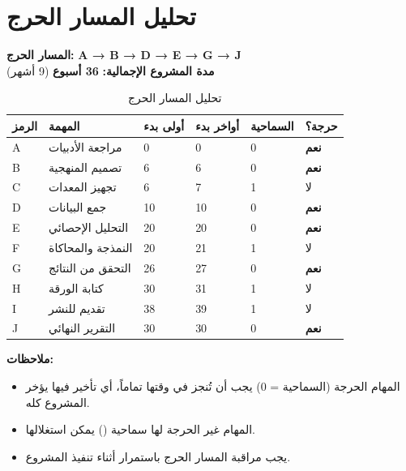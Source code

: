 \documentclass[11pt,a4paper,landscape]{article}
\begin{document}
\section{تحليل المسار الحرج}
\label{sec:analysis}

\textbf{المسار الحرج:} \color{criticalColor}\textbf{A → B → D → E → G → J}\color{black}\\[0.5em]
\textbf{مدة المشروع الإجمالية:} \textbf{36 أسبوع} (9 أشهر)

\begin{table}[H]
\centering
\caption{تحليل المسار الحرج}
\renewcommand{\arraystretch}{1.3}
\begin{tabularx}{\textwidth}{C{1cm} L{4cm} C{2cm} C{2cm} C{2cm} X}
\toprule
\textbf{الرمز} & \textbf{المهمة} & \textbf{أولى بدء} & \textbf{أواخر بدء} & \textbf{السماحية} & \textbf{حرجة؟} \\
\midrule
A & مراجعة الأدبيات & 0 & 0 & 0 & \color{criticalColor}\textbf{نعم} \\
B & تصميم المنهجية & 6 & 6 & 0 & \color{criticalColor}\textbf{نعم} \\
C & تجهيز المعدات & 6 & 7 & 1 & لا \\
D & جمع البيانات & 10 & 10 & 0 & \color{criticalColor}\textbf{نعم} \\
E & التحليل الإحصائي & 20 & 20 & 0 & \color{criticalColor}\textbf{نعم} \\
F & النمذجة والمحاكاة & 20 & 21 & 1 & لا \\
G & التحقق من النتائج & 26 & 27 & 0 & \color{criticalColor}\textbf{نعم} \\
H & كتابة الورقة & 30 & 31 & 1 & لا \\
I & تقديم للنشر & 38 & 39 & 1 & لا \\
J & التقرير النهائي & 30 & 30 & 0 & \color{criticalColor}\textbf{نعم} \\
\bottomrule
\end{tabularx}
\end{table}

\textbf{ملاحظات:}
\begin{itemize}
    \item المهام الحرجة (السماحية = 0) يجب أن تُنجز في وقتها تماماً، أي تأخير فيها يؤخر المشروع كله.
    \item المهام غير الحرجة لها سماحية () يمكن استغلالها.
    \item يجب مراقبة المسار الحرج باستمرار أثناء تنفيذ المشروع.
\end{itemize}
\end{document}
